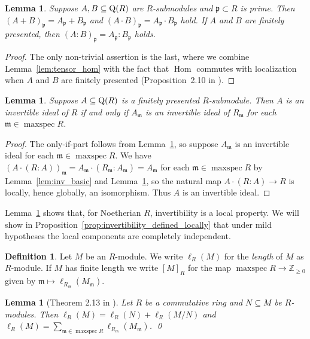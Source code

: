 \documentclass{amsart}
\theoremstyle{plain}
\newtheorem{lemma}[theorem]{Lemma}
\theoremstyle{definition}
\newtheorem{definition}[theorem]{Definition}
\DeclareMathOperator{\Hom}{Hom}
\DeclareMathOperator{\maxspec}{maxspec}
\newcommand{\Z}{\ensuremath{\mathbb{Z}}}
\newcommand{\m}{\ensuremath{\mathfrak{m}}}
\newcommand{\fm}{\ensuremath{\mathfrak{m}}}
\newcommand{\fp}{\ensuremath{\mathfrak{p}}}
\begin{document}
\begin{lemma}\label{lem:arith_loc}
Suppose \(A,B\subseteq\textup{Q}(R)\) are \(R\)-submodules and \(\fp\subset R\) is prime. Then \((A+B)_\fp=A_\fp+B_\fp\) and \((A\cdot B)_\fp=A_\fp\cdot B_\fp\) hold. If \(A\) and \(B\) are finitely presented, then \((A:B)_\fp=A_\fp:B_\fp\) holds.
\end{lemma}
\begin{proof}
The only non-trivial assertion is the last, where we combine Lemma~\ref{lem:tensor_hom} with the fact that \(\Hom\) commutes with localization when \(A\) and \(B\) are finitely presented (Proposition~2.10 in \cite{Eisenbud}).
\end{proof}

\begin{lemma}\label{lem:inv_loc_prop}
Suppose \(A\subseteq\textup{Q}(R)\) is a finitely presented \(R\)-submodule. Then \(A\) is an invertible ideal of \(R\) if and only if \(A_\fm\) is an invertible ideal of \(R_\m\) for each \(\fm\in\maxspec R\).
\end{lemma}
\begin{proof}
The only-if-part follows from Lemma~\ref{lem:arith_loc}, so suppose \(A_\fm\) is an invertible ideal for each \(\fm\in\maxspec R\).
We have \((A\cdot (R:A))_\fm=A_\fm\cdot(R_\fm:A_\fm)=A_\fm\) for each \(\fm\in\maxspec R\) by Lemma~\ref{lem:inv_basic} and Lemma~\ref{lem:arith_loc}, so the natural map \(A\cdot (R:A)\to R\) is locally, hence globally, an isomorphism. 
Thus \(A\) is an invertible ideal.
\end{proof}

Lemma~\ref{lem:inv_loc_prop} shows that, for Noetherian \(R\), invertibility is a local property. We will show in Proposition~\ref{prop:invertibility_defined_locally} that under mild hypotheses the local components are completely independent.

\begin{definition}
Let \(M\) be an \(R\)-module.
We write \(\ell_R(M)\) for the \emph{length} of \(M\) as \(R\)-module. 
If \(M\) has finite length we write \([M]_R\) for the map \(\maxspec R\to \Z_{\geq0}\) given by \(\mathfrak{m}\mapsto \ell_{R_\mathfrak{m}}(M_\mathfrak{m})\).
\end{definition}

\begin{lemma}[Theorem 2.13 in \cite{Eisenbud}]\label{lem:local_length}
Let \(R\) be a commutative ring and \(N\subseteq M\) be \(R\)-modules.
Then \(\ell_R(M)=\ell_R(N)+\ell_R(M/N)\) and \(\ell_R(M)=\sum_{\mathfrak{m}\in \maxspec R} \ell_{R_\mathfrak{m}}(M_\mathfrak{m})\). \qed
\end{lemma}
\end{document}
